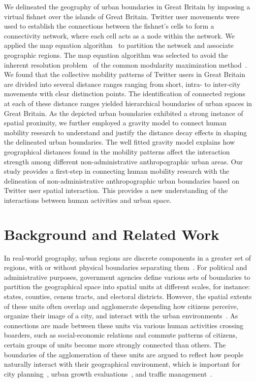 \documentclass[]{tGIS2e}
\begin{document}
We delineated the geography of urban boundaries in Great Britain by imposing a virtual fishnet over the islands of Great Britain.
Twitter user movements were used to establish the connections between the fishnet's cells to form a connectivity network, where each cell acts as a node within the network.
We applied the map equation algorithm~\citep{domenico2015} to partition the network and associate geographic regions.
The map equation algorithm was selected to avoid the inherent resolution problem~\citep{fortunato2007} of the common modularity maximization method~\citep{newman2006}. 
We found that the collective mobility patterns of Twitter users in Great Britain are divided into several distance ranges ranging from short, intra- to inter-city movements with clear distinction points. 
The identification of connected regions at each of these distance ranges yielded hierarchical boundaries of urban spaces in Great Britain.
As the depicted urban boundaries exhibited a strong instance of spatial proximity, we further employed a gravity model to connect human mobility research to understand and justify the distance decay effects in shaping the delineated urban boundaries.
The well fitted gravity model explains how geographical distances found in the mobility patterns affect the interaction strength among different non-administrative anthropographic urban areas. 
Our study provides a first-step in connecting human mobility research with the delineation of non-administrative anthropographic urban boundaries based on Twitter user spatial interaction. 
This provides a new understanding of the interactions between human activities and urban space. 

\section{Background and Related Work}
In real-world geography, urban regions are discrete components in a greater set of regions, with or without physical boundaries separating them~\citep{jiang2015}.
For political and administrative purposes, government agencies define various sets of boundaries to partition the geographical space into spatial units at different scales, for instance: states, counties, census tracts, and electoral districts.
However, the spatial extents of these units often overlap and agglomerate depending how citizens perceive, organize their image of a city, and interact with the urban environments~\citep{lynch1960}.
As connections are made between these units via various human activities crossing boarders, such as social-economic relations and commute patterns of citizens, certain groups of units become more strongly connected than others. The boundaries of the agglomeration of these units are argued to reflect how people naturally interact with their geographical environment, which is important for city planning~\citep{hollenstein2010}, urban growth evaluations~\citep{jiang2015,long2015}, and traffic management~\citep{gao2014}. 
\end{document}
